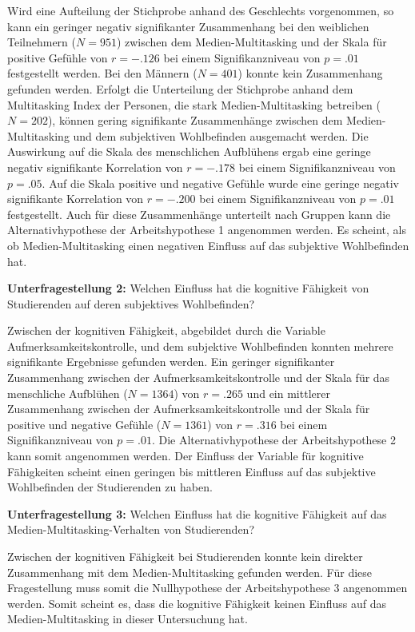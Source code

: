 Wird eine Aufteilung der Stichprobe anhand des Geschlechts vorgenommen, so kann ein geringer negativ signifikanter Zusammenhang bei den weiblichen Teilnehmern ($N=951$) zwischen dem Medien-Multitasking und der Skala für positive Gefühle von $r=-.126$ bei einem Signifikanzniveau von $p=.01$ festgestellt werden. Bei den Männern ($N=401$) konnte kein Zusammenhang gefunden werden. Erfolgt die Unterteilung der Stichprobe anhand dem Multitasking Index der Personen, die stark Medien-Multitasking betreiben ($N=202$), können gering signifikante Zusammenhänge zwischen dem Medien-Multitasking und dem subjektiven Wohlbefinden ausgemacht werden. Die Auswirkung auf die Skala des  menschlichen Aufblühens ergab eine geringe negativ signifikante Korrelation von $r=-.178$ bei einem Signifikanzniveau von $p=.05$. Auf die Skala positive und negative Gefühle wurde eine geringe negativ signifikante Korrelation von $r=-.200$ bei einem Signifikanzniveau von $p=.01$ festgestellt. Auch für diese Zusammenhänge unterteilt nach Gruppen kann die Alternativhypothese der Arbeitshypothese 1 angenommen werden. Es scheint, als ob Medien-Multitasking einen negativen Einfluss auf das subjektive Wohlbefinden hat.
\par
\textbf{Unterfragestellung 2:} Welchen Einfluss hat die kognitive Fähigkeit von Studierenden auf deren subjektives Wohlbefinden?
\par
Zwischen der kognitiven Fähigkeit, abgebildet durch die Variable Aufmerksamkeitskontrolle, und dem subjektive Wohlbefinden konnten mehrere signifikante Ergebnisse gefunden werden. Ein geringer signifikanter Zusammenhang zwischen der Aufmerksamkeitskontrolle und der Skala für das menschliche Aufblühen ($N=1364$) von $r=.265$ und ein mittlerer Zusammenhang zwischen der Aufmerksamkeitskontrolle und der Skala für positive und negative Gefühle ($N=1361$) von $r=.316$ bei einem Signifikanzniveau von $p=.01$. Die Alternativhypothese der Arbeitshypothese 2 kann somit angenommen werden. Der Einfluss der Variable für kognitive Fähigkeiten scheint einen geringen bis mittleren Einfluss auf das subjektive Wohlbefinden der Studierenden zu haben.
\par
\textbf{Unterfragestellung 3:} Welchen Einfluss hat die kognitive Fähigkeit auf das Medien-Multitasking-Verhalten von Studierenden?
\par
Zwischen der kognitiven Fähigkeit bei Studierenden konnte kein direkter Zusammenhang mit dem Medien-Multitasking gefunden werden. Für diese Fragestellung muss somit die Nullhypothese der Arbeitshypothese 3 angenommen werden. Somit scheint es, dass die kognitive Fähigkeit keinen Einfluss auf das Medien-Multitasking in dieser Untersuchung hat. \\
